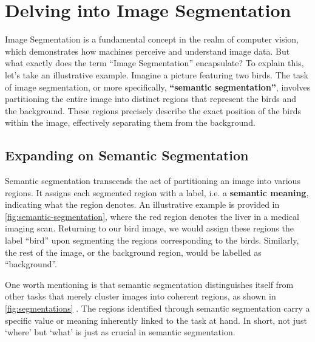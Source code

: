 \section{Delving into Image Segmentation}

Image Segmentation is a fundamental concept in the realm of computer vision, which demonstrates how machines perceive and understand image data. But what exactly does the term “Image Segmentation” encapsulate? To explain this, let's take an illustrative example. Imagine a picture featuring two birds. The task of image segmentation, or more specifically, \textbf{“semantic segmentation”}, involves partitioning the entire image into distinct regions that represent the birds and the background. These regions precisely describe the exact position of the birds within the image, effectively separating them from the background.

\subsection{Expanding on Semantic Segmentation}

Semantic segmentation transcends the act of partitioning an image into various regions. It assigns each segmented region with a label, i.e. a \textbf{semantic meaning}, indicating what the region denotes. An illustrative example is provided in \autoref{fig:semantic-segmentation}, where the red region denotes the liver in a medical imaging scan. Returning to our bird image, we would assign these regions the label “bird” upon segmenting the regions corresponding to the birds. Similarly, the rest of the image, or the background region, would be labelled as “background”.

One worth mentioning is that semantic segmentation distinguishes itself from other tasks that merely cluster images into coherent regions, as shown in \autoref{fig:segmentations} \cite{segmentation-mli}. The regions identified through semantic segmentation carry a specific value or meaning inherently linked to the task at hand. In short, not just `where' but `what' is just as crucial in semantic segmentation.

